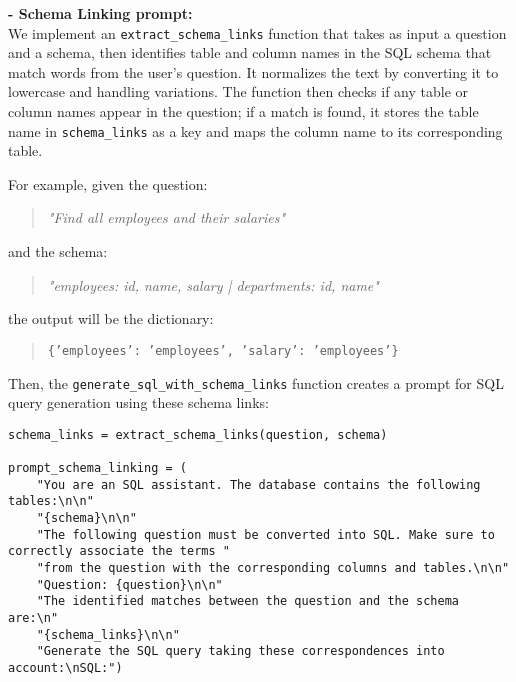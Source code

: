 \documentclass[12pt,a4paper]{article}
\begin{document}
\textbf{- Schema Linking  prompt:} \\


We implement an \texttt{extract\_schema\_links} function that takes as input a question and a schema, then identifies table and column names in the SQL schema that match words from the user's question. It normalizes the text by converting it to lowercase and handling variations. The function then checks if any table or column names appear in the question; if a match is found, it stores the table name in \texttt{schema\_links} as a key and maps the column name to its corresponding table.  

For example, given the question:  
\begin{quote}
    \textit{"Find all employees and their salaries"}
\end{quote}
and the schema:  
\begin{quote}
    \textit{"employees: id, name, salary | departments: id, name"}
\end{quote}
the output will be the dictionary:  
\begin{quote}
    \texttt{\{'employees': 'employees', 'salary': 'employees'\}}
\end{quote}

Then, the \texttt{generate\_sql\_with\_schema\_links} function creates a prompt for SQL query generation using these schema links:
\begin{verbatim}
schema_links = extract_schema_links(question, schema)

prompt_schema_linking = (
    "You are an SQL assistant. The database contains the following tables:\n\n"
    "{schema}\n\n"
    "The following question must be converted into SQL. Make sure to correctly associate the terms "
    "from the question with the corresponding columns and tables.\n\n"
    "Question: {question}\n\n"
    "The identified matches between the question and the schema are:\n"
    "{schema_links}\n\n"
    "Generate the SQL query taking these correspondences into account:\nSQL:")
\end{verbatim}
\end{document}
